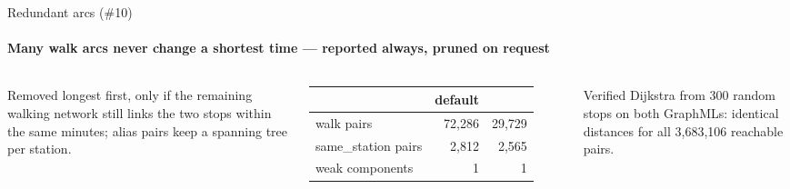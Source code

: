 \documentclass[aspectratio=169,10pt]{beamer}
\newcommand{\code}[1]{\texttt{\detokenize{#1}}}
\begin{document}
\begin{frame}{Redundant arcs (\#10)}
  \framesubtitle{Many walk arcs never change a shortest time --- reported always, pruned on request}
  \begin{columns}[c]
    \centering
    \vskip0.2cm
    \scriptsize Removed longest first, only if the remaining walking network still links the two stops within the
    same minutes; alias pairs keep a spanning tree per station.
    \scriptsize
    \renewcommand{\arraystretch}{1.3}
    \begin{tabular}{@{}l r r@{}}
      \hline
      & \textbf{default} & \textbf{\code{--prune-station-network}} \\ \hline
      walk pairs & 72,286 & 29,729 \\
      same\_station pairs & 2,812 & 2,565 \\
      weak components & 1 & 1 \\ \hline
    \end{tabular}
    \vskip0.25cm
    \begin{exampleblock}{Verified}
      \scriptsize Dijkstra from 300 random stops on both GraphMLs: identical \code{time_min} distances for all
      3,683,106 reachable pairs.
    \end{exampleblock}
  \end{columns}
\end{frame}
\end{document}
